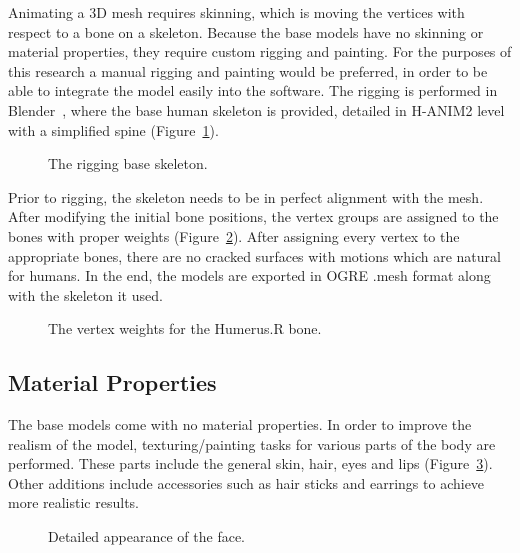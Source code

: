Animating a 3D mesh requires skinning, which is moving the vertices with respect to a bone on a skeleton. Because the base models have no skinning or material properties, they require custom rigging and painting. For the purposes of this research a manual rigging and painting would be preferred, in order to be able to integrate the model easily into the software. The rigging is performed in Blender~\cite{Blender}, where the base human skeleton is provided, detailed in H-ANIM2 level with a simplified spine (Figure~\ref{fig:rigging_skeleton}). 

\begin{figure}[h]
\centerline{}
\caption{The rigging base skeleton.}
\label{fig:rigging_skeleton}
\end{figure}

Prior to rigging, the skeleton needs to be in perfect alignment with the mesh. After modifying the initial bone positions, the vertex groups are assigned to the bones with proper weights (Figure~\ref{fig:weight_humerus_r}).
After assigning every vertex to the appropriate bones, there are no cracked surfaces with motions which are natural for humans. In the end, the models are exported in OGRE .mesh format along with the skeleton it used.

\begin{figure}[h]
\centerline{}
\caption{The vertex weights for the Humerus.R bone.}
\label{fig:weight_humerus_r} 
\end{figure}

\subsection{Material Properties}

The base models come with no material properties. In order to improve the realism of the model, texturing/painting tasks for various parts of the body are performed. These parts include the general skin, hair, eyes and lips (Figure~\ref{fig:detailed_face}). Other additions include accessories such as hair sticks and earrings to achieve more realistic results.

\begin{figure}[h]
\centerline{}
\caption{Detailed appearance of the face.}
\label{fig:detailed_face}
\end{figure}

